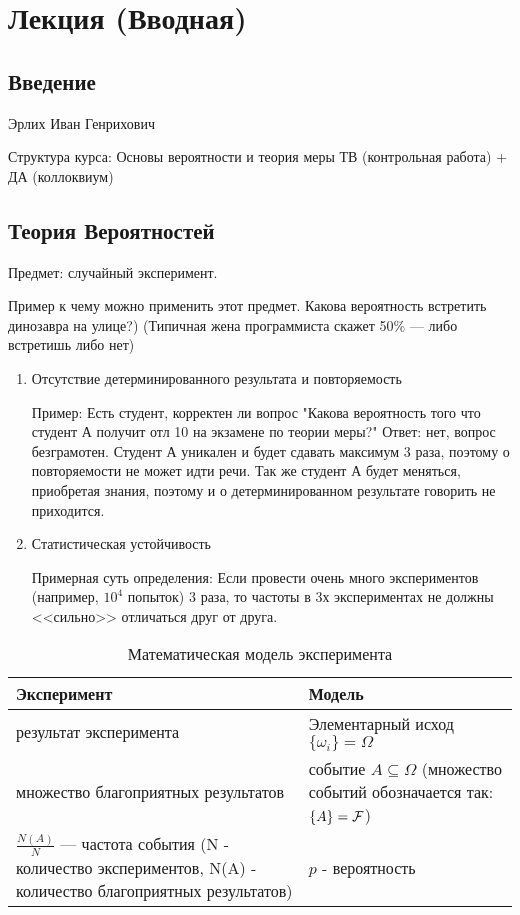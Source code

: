 \section{Лекция (Вводная)}
\subsection{Введение}
Эрлих  Иван Генрихович

Структура курса:
Основы вероятности и теория меры
ТВ (контрольная работа) + ДА (коллоквиум)

\subsection{Теория Вероятностей}

Предмет: случайный эксперимент.

Пример к чему можно применить этот предмет. Какова вероятность встретить динозавра на улице?) (Типичная жена программиста скажет 50\% --- либо встретишь либо нет)

\begin{enumerate}
	\item Отсутствие детерминированного результата и повторяемость
	
	Пример: Есть студент, корректен ли вопрос "Какова вероятность того что студент А получит отл 10 на экзамене по теории меры?" 
	Ответ: нет, вопрос безграмотен. Студент А уникален и будет сдавать максимум 3 раза, поэтому о повторяемости не может идти речи. Так же студент А будет меняться, приобретая знания, поэтому и о детерминированном результате говорить не приходится.
	
	\item Статистическая устойчивость
	
	Примерная суть определения:
	Если провести очень много экспериментов (например, $10^4$ попыток) 3 раза, то частоты в 3х экспериментах не должны <<сильно>> отличаться друг от друга. 
\end{enumerate}



\begin{table}[!ht]
	\caption{Математическая модель эксперимента}
	\begin{tabular}{p{}|p{}}
		Эксперимент & Модель \\
		\hline
		результат эксперимента & Элементарный исход $ \{\omega_i\} = \Omega $  \\
		множество благоприятных результатов & событие $A \subseteq \Omega$ 
		(множество событий обозначается так: $\{A\} = \mathcal{F}$) \\
		$\frac{N(A)}{N}$ --- частота события (N - количество экспериментов, N(A) - количество благоприятных результатов) & $p$ - вероятность \\
		\hline
	\end{tabular}
\end{table}


